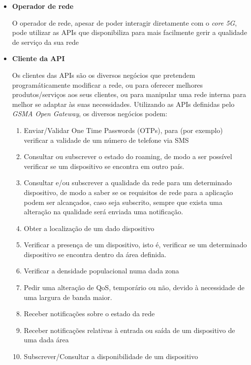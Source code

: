 \begin{itemize}
  \item \textbf{Operador de rede}

    O operador de rede, apesar de poder interagir diretamente com
    o \emph{core 5G}, pode utilizar as APIs que disponibiliza para
    mais facilmente gerir a qualidade de serviço da sua rede

  \item{\textbf{Cliente da API}}

    Os clientes das APIs são os diversos negócios que pretendem
    programáticamente modificar a rede, ou para oferecer 
    melhores produtos/serviços aos seus clientes, ou para
    manipular uma rede interna para melhor se adaptar às suas
    necessidades.
    Utilizando as APIs definidas pelo \emph{GSMA Open Gateway},
    os diversos negócios podem:
    \begin{enumerate}
      \item Enviar/Validar One Time Passwords (OTPs), para 
        (por exemplo) verificar a validade de um número de telefone
        via SMS
      \item Consultar ou subscrever o estado do roaming, de modo a
        ser possível verificar se um dispositivo se encontra em
        outro país.
      \item Consultar e/ou subscrever a qualidade da rede para um
        determinado dispositivo, de modo a saber se os requisitos
        de rede para a aplicação podem ser alcançados, caso seja 
        subscrito, sempre que exista uma alteração na qualidade 
        será enviada uma notificação.

      \item Obter a localização de um dado dispositivo
      \item Verificar a presença de um dispositivo, isto é,
        verificar se um determinado dispositivo se encontra dentro 
        da área definida.
      \item Verificar a densidade populacional numa dada zona
      \item Pedir uma alteração de QoS, temporário ou não, devido à
        necessidade de uma largura de banda maior.
      \item Receber notificações sobre o estado da rede
      \item Receber notificações relativas à entrada ou saída de
        um dispositivo de uma dada área
      \item Subscrever/Consultar a disponibilidade de um
        dispositivo
    \end{enumerate}
\end{itemize}

